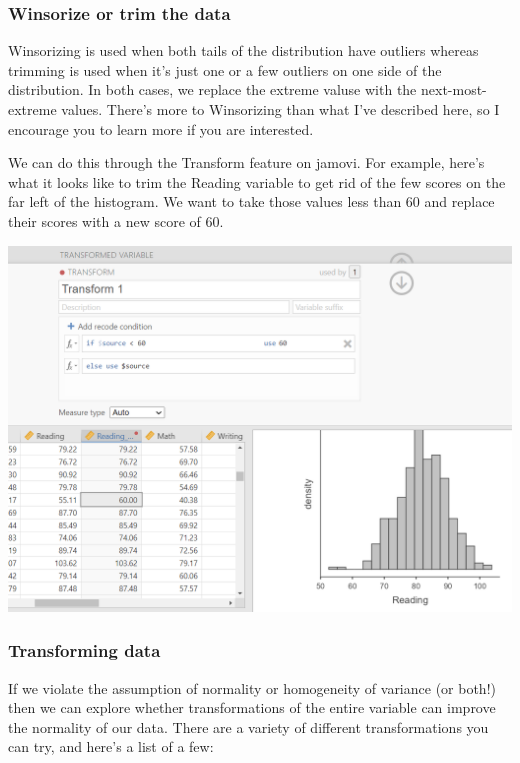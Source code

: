 \documentclass[
]{book}
\begin{document}
\hypertarget{winsorize-or-trim-the-data}{%
\subsubsection{Winsorize or trim the data}\label{winsorize-or-trim-the-data}}

Winsorizing is used when both tails of the distribution have outliers whereas trimming is used when it's just one or a few outliers on one side of the distribution. In both cases, we replace the extreme valuse with the next-most-extreme values. There's more to Winsorizing than what I've described here, so I encourage you to learn more if you are interested.

We can do this through the Transform feature on jamovi. For example, here's what it looks like to trim the Reading variable to get rid of the few scores on the far left of the histogram. We want to take those values less than 60 and replace their scores with a new score of 60.

\includegraphics{images/03-jamovi/winsorize.png}

\hypertarget{transforming-data}{%
\subsubsection{Transforming data}\label{transforming-data}}

If we violate the assumption of normality or homogeneity of variance (or both!) then we can explore whether transformations of the entire variable can improve the normality of our data. There are a variety of different transformations you can try, and here's a list of a few:
\end{document}
